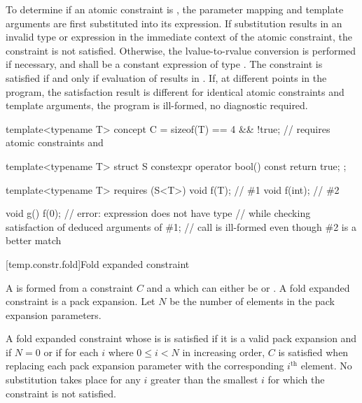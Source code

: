 \pnum
To determine if an atomic constraint is
,
the parameter mapping and template arguments are
first substituted into its expression.
If substitution results in an invalid type or expression
in the immediate context of the atomic constraint,
the constraint is not satisfied.
Otherwise, the lvalue-to-rvalue conversion
is performed if necessary,
and  shall be a constant expression of type .
The constraint is satisfied if and only if evaluation of 
results in .
If, at different points in the program, the satisfaction result is different
for identical atomic constraints and template arguments,
the program is ill-formed, no diagnostic required.
\begin{example}
\begin{codeblock}
template<typename T> concept C =
  sizeof(T) == 4 && !true;      // requires atomic constraints  and 

template<typename T> struct S {
  constexpr operator bool() const { return true; }
};

template<typename T> requires (S<T>{})
void f(T);                      // \#1
void f(int);                    // \#2

void g() {
  f(0);                         // error: expression  does not have type 
}                               // while checking satisfaction of deduced arguments of \#1;
                                // call is ill-formed even though \#2 is a better match
\end{codeblock}
\end{example}

[temp.constr.fold]{Fold expanded constraint}

\pnum
A  is formed from a constraint $C$ and
a 
which can either be \tcode{\&\&} or \tcode{||}.
A fold expanded constraint is a pack expansion.
Let $N$ be the number of elements
in the pack expansion parameters.

\pnum
A fold expanded constraint whose  is \tcode{\&\&}
is satisfied if it is a valid pack expansion and
if $N = 0$ or if for each $i$ where $0 \le i < N$ in increasing order,
$C$ is satisfied
when replacing each pack expansion parameter
with the corresponding $i^\text{th}$ element.
No substitution takes place for any $i$ greater than
the smallest $i$ for which the constraint is not satisfied.

